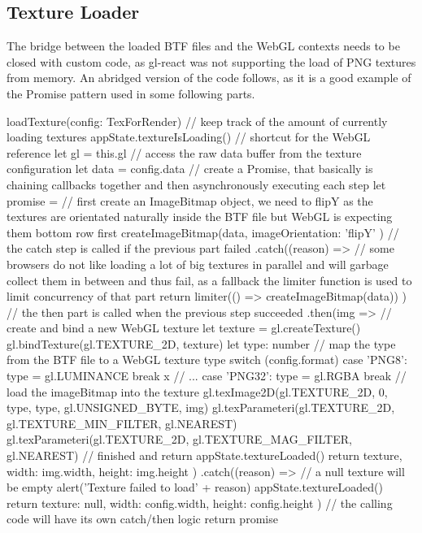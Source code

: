 \subsection{Texture Loader}\label{sec_textureloader}
The bridge between the loaded BTF files and the WebGL contexts needs to be
closed with custom code, as gl-react was not supporting the load of PNG textures
from memory. An abridged version of the code follows, as it is a good example of
the Promise pattern used in some following parts.
\begin{typescript}
loadTexture(config: TexForRender) {
    // keep track of the amount of currently loading textures
    appState.textureIsLoading()
    // shortcut for the WebGL reference
    let gl = this.gl
    // access the raw data buffer from the texture configuration
    let data = config.data
    // create a Promise, that basically is chaining callbacks together and then asynchronously executing each step
    let promise =
        // first create an ImageBitmap object, we need to flipY as the textures
        are orientated naturally inside the BTF file but WebGL is expecting them bottom row first
        createImageBitmap(data, { imageOrientation: 'flipY' })
        // the catch step is called if the previous part failed
        .catch((reason) => {
            // some browsers do not like loading a lot of big textures in parallel and will garbage collect them in between and thus fail, as a fallback the limiter function is used to limit concurrency of that part
            return limiter(() => createImageBitmap(data))
        })
        // the then part is called when the previous step succeeded
        .then(img => {
            // create and bind a new WebGL texture
            let texture = gl.createTexture()
            gl.bindTexture(gl.TEXTURE_2D, texture)
            let type: number
            // map the type from the BTF file to a WebGL texture type
            switch (config.format) {
                case 'PNG8':
                    type = gl.LUMINANCE
                    break
x                // ...
                case 'PNG32':
                    type = gl.RGBA
                    break
            }
            // load the imageBitmap into the texture
            gl.texImage2D(gl.TEXTURE_2D, 0, type, type, gl.UNSIGNED_BYTE, img)
            gl.texParameteri(gl.TEXTURE_2D, gl.TEXTURE_MIN_FILTER, gl.NEAREST)
            gl.texParameteri(gl.TEXTURE_2D, gl.TEXTURE_MAG_FILTER, gl.NEAREST)
            // finished and return
            appState.textureLoaded()
            return { texture, width: img.width, height: img.height }
        })
        .catch((reason) => {
            // a null texture will be empty
            alert('Texture failed to load' + reason)
            appState.textureLoaded()
            return { texture: null, width: config.width, height: config.height }
        })
   // the calling code will have its own catch/then logic
   return promise
}
\end{typescript}

